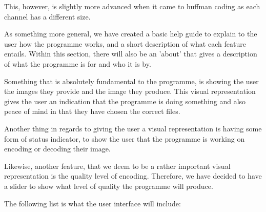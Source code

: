 This, however, is slightly more advanced when it came to huffman coding as each channel has a different size.

As something more general, we have created a basic help guide to explain to the user how the programme works, and a short description of what each feature entails.
Within this section, there will also be an 'about' that gives a description of what the programme is for and who it is by.

Something that is absolutely fundamental to the programme, is showing the user the images they provide and the image they produce.
This visual representation gives the user an indication that the programme is doing something and also peace of mind in that they have chosen the correct files.

Another thing in regards to giving the user a visual representation is having some form of status indicator, to show the user that the programme is working on encoding or decoding their image.

Likewise, another feature, that we deem to be a rather important visual representation is the quality level of encoding.
Therefore, we have decided to have a slider to show what level of quality the programme will produce.

The following list is what the user interface will include:

